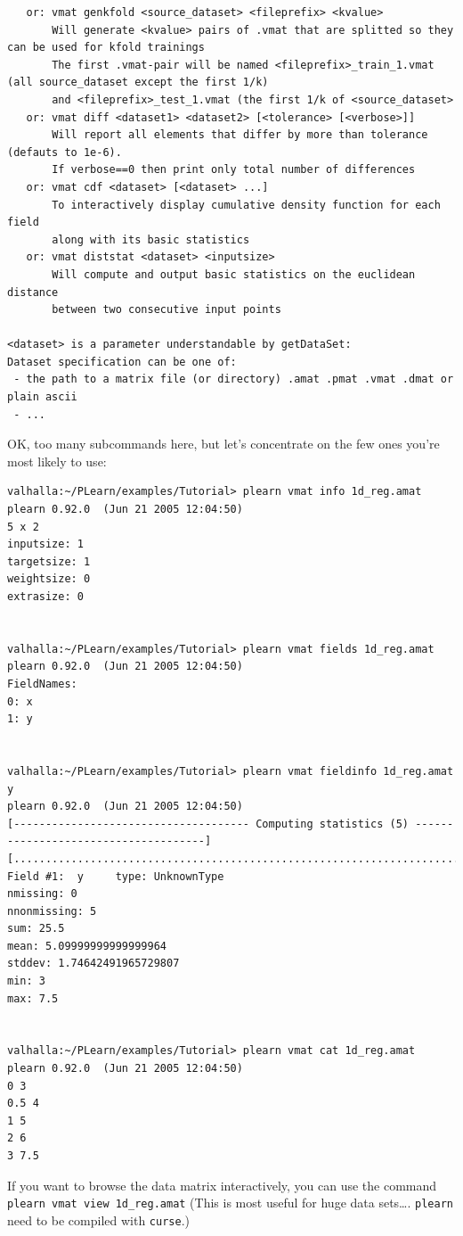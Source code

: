 \documentclass[11pt]{book}
\begin{document}
\begin{verbatim}
   or: vmat genkfold <source_dataset> <fileprefix> <kvalue>
       Will generate <kvalue> pairs of .vmat that are splitted so they can be used for kfold trainings
       The first .vmat-pair will be named <fileprefix>_train_1.vmat (all source_dataset except the first 1/k)
       and <fileprefix>_test_1.vmat (the first 1/k of <source_dataset>
   or: vmat diff <dataset1> <dataset2> [<tolerance> [<verbose>]]
       Will report all elements that differ by more than tolerance (defauts to 1e-6).
       If verbose==0 then print only total number of differences
   or: vmat cdf <dataset> [<dataset> ...]
       To interactively display cumulative density function for each field
       along with its basic statistics
   or: vmat diststat <dataset> <inputsize>
       Will compute and output basic statistics on the euclidean distance
       between two consecutive input points

<dataset> is a parameter understandable by getDataSet:
Dataset specification can be one of:
 - the path to a matrix file (or directory) .amat .pmat .vmat .dmat or plain ascii
 - ... 
\end{verbatim}

OK, too many subcommands here, but let's concentrate on the few ones you're most likely to use:

\begin{verbatim}
valhalla:~/PLearn/examples/Tutorial> plearn vmat info 1d_reg.amat
plearn 0.92.0  (Jun 21 2005 12:04:50)
5 x 2
inputsize: 1
targetsize: 1
weightsize: 0
extrasize: 0


valhalla:~/PLearn/examples/Tutorial> plearn vmat fields 1d_reg.amat
plearn 0.92.0  (Jun 21 2005 12:04:50)
FieldNames:
0: x
1: y


valhalla:~/PLearn/examples/Tutorial> plearn vmat fieldinfo 1d_reg.amat y
plearn 0.92.0  (Jun 21 2005 12:04:50)
[------------------------------------- Computing statistics (5) -------------------------------------]
[....................................................................................................]
Field #1:  y     type: UnknownType
nmissing: 0
nnonmissing: 5
sum: 25.5
mean: 5.09999999999999964
stddev: 1.74642491965729807
min: 3
max: 7.5


valhalla:~/PLearn/examples/Tutorial> plearn vmat cat 1d_reg.amat
plearn 0.92.0  (Jun 21 2005 12:04:50)
0 3
0.5 4
1 5
2 6
3 7.5
\end{verbatim}

If you want to browse the data matrix interactively, you can use the
command \verb!plearn vmat view 1d_reg.amat! (This is most useful for huge data sets\ldots. \verb!plearn! need to be compiled with \verb!curse!.)
\end{document}
